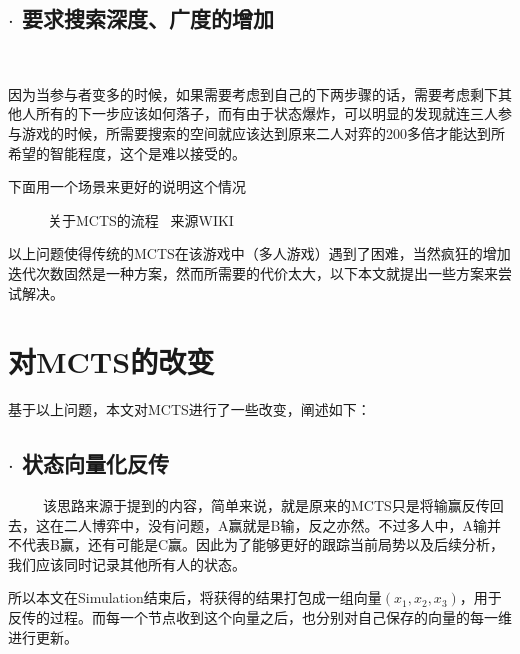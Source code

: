 \documentclass[9pt,twocolumn,twoside]{osajnl}
\begin{document}
\subsection{$\cdot$ 要求搜索深度、广度的增加}
\begin{adjustwidth}{2em}{}
	\ \ \ \ \
	
	因为当参与者变多的时候，如果需要考虑到自己的下两步骤的话，需要考虑剩下其他人所有的下一步应该如何落子，而有由于状态爆炸，可以明显的发现就连三人参与游戏的时候，所需要搜索的空间就应该达到原来二人对弈的200多倍才能达到所希望的智能程度，这个是难以接受的。
	
	下面用一个场景来更好的说明这个情况
	
	\begin{figure}[htbp]
		\centering
		\caption{关于MCTS的流程 \ 来源WIKI \cite{MCTSGraphWiki}}
		\label{fig:false-color}
	\end{figure}
	
\end{adjustwidth}

以上问题使得传统的MCTS在该游戏中（多人游戏）遇到了困难，当然疯狂的增加迭代次数固然是一种方案，然而所需要的代价太大，以下本文就提出一些方案来尝试解决。

\section{对MCTS的改变}
基于以上问题，本文对MCTS进行了一些改变，阐述如下：
\subsection{$\cdot$ 状态向量化反传\cite{MCTSMPG}}
\begin{adjustwidth}{2em}{}
	\ \ \ \ \
该思路来源于\cite{MCTSMPG}提到的内容，简单来说，就是原来的MCTS只是将输赢反传回去，这在二人博弈中，没有问题，A赢就是B输，反之亦然。不过多人中，A输并不代表B赢，还有可能是C赢。因此为了能够更好的跟踪当前局势以及后续分析，我们应该同时记录其他所有人的状态。

所以本文在Simulation结束后，将获得的结果打包成一组向量$(x_1,x_2,x_3)$，用于反传的过程。而每一个节点收到这个向量之后，也分别对自己保存的向量的每一维进行更新。
\end{adjustwidth}
\end{document}
